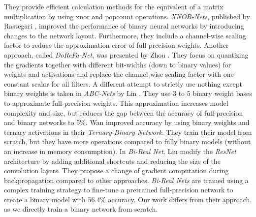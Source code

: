 \documentclass[10pt,twocolumn,letterpaper]{article}
\newcommand{\architecture}[1]{\emph{#1}}
\newcommand{\arch}[1]{\emph{#1}}
\begin{document}
They provide efficient calculation methods for the equivalent of a matrix multiplication by using $\mathrm{xnor}$ and $\mathrm{popcount}$ operations.
\emph{XNOR-Nets}, published by Rastegari \etal\cite{Rastegari2016}, improved the performance of binary neural networks by introducing changes to the network layout.
Furthermore, they include a channel-wise scaling factor to reduce the approximation error of full-precision weights.
Another approach, called \emph{DoReFa-Net}, was presented by Zhou \etal\cite{Zhou2016}.
They focus on quantizing the gradients together with different bit-widths (down to binary values) for weights and activations and replace the channel-wise scaling factor with one constant scalar for all filters.
A different attempt to strictly use nothing except binary weights is taken in \emph{ABC-Nets} by Lin \etal\cite{lin2017towards}.
They use 3 to 5 binary weight bases to approximate full-precision weights.
This approximation increases model complexity and size, but reduces the gap between the accuracy of full-precision and binary networks to 5\%.
Wan \etal\cite{Wan_2018_ECCV} improved accuracy by using binary weights and ternary activations in their \emph{Ternary-Binary Network}. 
They train their model from scratch, but they have more operations compared to fully binary models (without an increase in memory consumption).
In \emph{Bi-Real Net}, Liu \etal\cite{Liu_2018_ECCV} modify the \arch{ResNet} architecture by adding additional shortcuts and reducing the size of the convolution layers.
They propose a change of gradient computation during backpropagation compared to other approaches.
\architecture{Bi-Real Nets} are trained using a complex training strategy to fine-tune a pretrained full-precision network to create a binary model with 56.4\% accuracy.
Our work differs from their approach, as we directly train a binary network from scratch.
\end{document}
